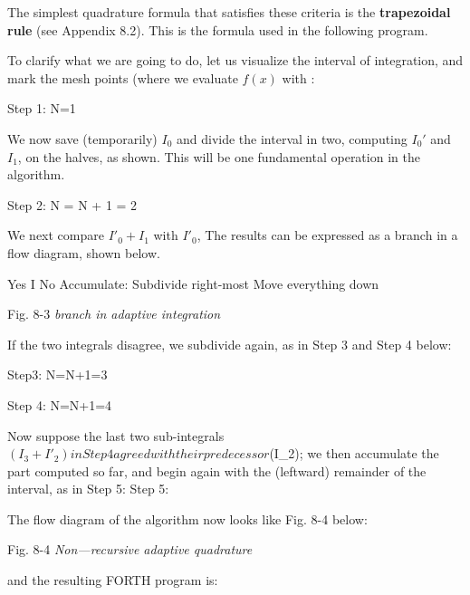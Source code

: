 The simplest quadrature formula that satisfies these criteria is the \textbf{trapezoidal rule} (see Appendix 8.2). This is the formula used in the following program.

To clarify what we are going to do, let us visualize the interval of integration, and mark the mesh points (where we evaluate $f(x)$ with \bc{+}:

Step 1: N=1

We now save (temporarily) $I_0$ and divide the interval in two, computing $I_{0}'$ and $I_1$, on the halves, as shown. This will be one fundamental operation in the algorithm.

Step 2: N = N + 1 = 2

We next compare $I'_0 + I_1$ with $I'_0$, The results can be expressed as a branch in a flow diagram, shown below.

Yes I No
Accumulate: Subdivide right-most
Move everything down

Fig. 8-3  \textit{branch in adaptive integration}

If the two integrals disagree, we subdivide again, as in Step 3 and
Step 4 below:

Step3: N=N+1=3

Step 4: N=N+1=4

Now suppose the last two sub-integrals $(I_3 + I'_2) in Step 4 agreed with their predecessor $(I_2); we then accumulate the part computed so far, and begin again with the (leftward) remainder of the interval, as in Step 5:
Step 5:

The flow diagram of the algorithm now looks like Fig. 8-4 below:

Fig. 8-4 \textit{Non—recursive adaptive quadrature}

and the resulting FORTH program is:

